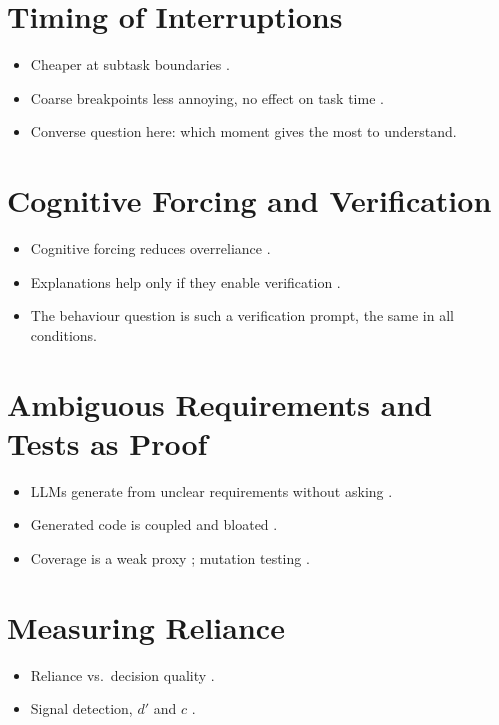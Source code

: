 \section{Timing of Interruptions}
\begin{itemize}
  \item Cheaper at subtask boundaries \citep{iqbal_leveraging_2006}.
  \item Coarse breakpoints less annoying, no effect on task time \citep{adamczyk_if_2004}.
  \item Converse question here: which moment gives the most to understand.
\end{itemize}

\section{Cognitive Forcing and Verification}
\begin{itemize}
  \item Cognitive forcing reduces overreliance \citep{bucinca_trust_2021,ghosh_experimental_2026,li_guided_2026}.
  \item Explanations help only if they enable verification \citep{fok_search_2024,zhang_you_2024}.
  \item The behaviour question is such a verification prompt, the same in all conditions.
\end{itemize}

\section{Ambiguous Requirements and Tests as Proof}
\begin{itemize}
  \item LLMs generate from unclear requirements without asking \citep{mu_clarifygpt_2024,yang_clarity_2026}.
  \item Generated code is coupled and bloated \citep{kravchuk_modular_2025,zhu_ai_2026}.
  \item Coverage is a weak proxy \citep{inozemtseva_coverage_2014}; mutation testing \citep{jia_analysis_2011}.
\end{itemize}

\section{Measuring Reliance}
\begin{itemize}
  \item Reliance vs.\ decision quality \citep{schoffer_ai_2025,guo_decision_2024}.
  \item Signal detection, \(d'\) and \(c\) \citep{stanislaw_calculation_1999,decarlo_signal_1998}.
\end{itemize}

